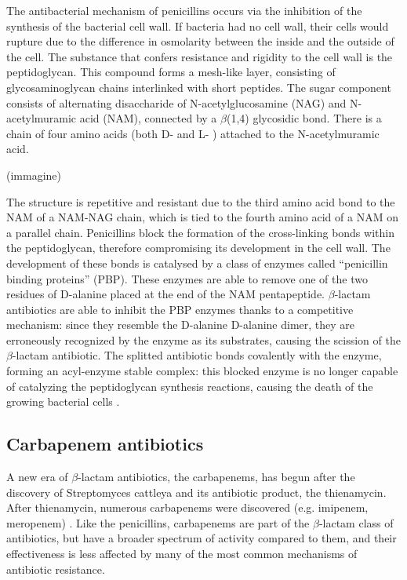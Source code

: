 \documentclass[11pt]{report}
\begin{document}
The antibacterial mechanism of penicillins occurs via the inhibition of the synthesis of the bacterial cell wall. If bacteria had no cell wall, their cells would rupture due to the difference in osmolarity between the inside and the outside of the cell.
The substance that confers resistance and rigidity to the cell wall is the peptidoglycan. This compound forms a mesh-like layer, consisting of glycosaminoglycan chains interlinked with short peptides. The sugar component consists of alternating disaccharide of N-acetylglucosamine (NAG) and N-acetylmuramic acid (NAM), connected by a $\beta$(1,4) glycosidic bond. There is a chain of four amino acids (both D- and L- ) attached to the N-acetylmuramic acid.

(immagine)

The structure is repetitive and resistant due to the third amino acid bond to the NAM of a NAM-NAG chain, which is tied to the fourth amino acid of a NAM on a parallel chain.
Penicillins block the formation of the cross-linking bonds within the peptidoglycan, therefore compromising its development in the cell wall. The development of these bonds is catalysed by a class of enzymes called “penicillin binding proteins” (PBP). These enzymes are able to remove one of the two residues of D-alanine placed at the end of the NAM pentapeptide.
$\beta$-lactam antibiotics are able to inhibit the PBP enzymes thanks to a competitive mechanism: since they resemble the D-alanine D-alanine dimer, they are erroneously recognized by the enzyme as its substrates, causing the scission of the $\beta$-lactam antibiotic. The splitted antibiotic bonds covalently with the enzyme, forming an acyl-enzyme stable complex: this blocked enzyme is no longer capable of catalyzing the peptidoglycan synthesis reactions, causing the death of the growing bacterial cells \cite{KONG2010}.


\subsection{Carbapenem antibiotics}
A new era of $\beta$-lactam antibiotics, the carbapenems, has begun after the discovery of Streptomyces cattleya and its antibiotic product, the thienamycin.
After thienamycin, numerous carbapenems were discovered (e.g. imipenem, meropenem) \cite{Birnbaum1985}.
Like the penicillins, carbapenems are part of the $\beta$-lactam class of antibiotics, but have a broader spectrum of activity compared to them, and their effectiveness is less affected by many of the most common mechanisms of antibiotic resistance.
\end{document}
